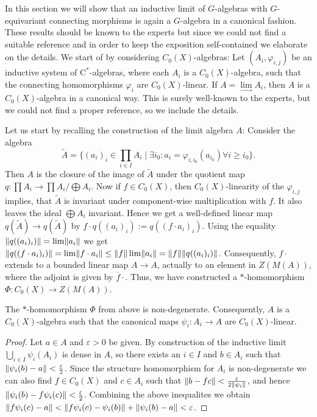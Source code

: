 In this section we will show that an inductive limit of $G$-algebras with $G$-equivariant connecting morphisms is again a $G$-algebra in a canonical fashion. These results should be known to the experts but since we could not find a suitable reference and in order to keep the exposition self-contained we elaborate on the details. We start of by considering $C_0(X)$-algebras:
	Let $(A_i,\varphi_{i,j})$ be an inductive system of $\mathrm{C}^*$-al\-gebras, where each $A_i$ is a $C_0(X)$-algebra, such that the connecting homomorphisms $\varphi_i$ are $C_0(X)$-linear.
	If $A=\lim\limits_{\rightarrow}A_i$, then $A$ is a $C_0(X)$-algebra in a canonical way. This is surely well-known to the experts, but we could not find a proper reference, so we include the details.
	
	Let us start by recalling the construction of the limit algebra $A$:
	Consider the algebra $$\widetilde{A}=\lbrace (a_i)_i\in\prod\limits_{i\in I}A_i\mid \exists i_0: a_{i}=\varphi_{i,i_0}(a_{i_0})\forall i\geq i_0\rbrace.$$
	Then $A$ is the closure of the image of $\widetilde{A}$ under the quotient map $q:\prod A_i\rightarrow \prod A_i/\bigoplus A_i$.
	Now if $f\in C_0(X)$, then $C_0(X)$-linearity of the $\varphi_{i,j}$ implies, that $\widetilde{A}$ is invariant under component-wise multiplication with $f$. It also leaves the ideal $\bigoplus A_i$ invariant. Hence we get a well-defined linear map
	$q(\widetilde{A})\rightarrow q(\widetilde{A})$ by $f\cdot q((a_i)_i):=q((f\cdot a_i)_i)$. Using the equality $\lVert q((a_i)_i)\rVert=\lim \lVert a_i\rVert$ we get
	$\lVert q((f\cdot a_i)_i)\rVert=\lim \lVert f\cdot a_i\rVert\leq \lVert f\rVert\lim \lVert a_i\rVert=\lVert f\rVert\lVert q((a_i)_i)\rVert$. Consequently, $f\cdot$ extends to a bounded linear map $A\rightarrow A$, actually to an element in $Z(M(A))$, where the adjoint is given by $\overline{f}\cdot$. Thus, we have constructed a $*$-homomorphism $\Phi:C_0(X)\rightarrow Z(M(A))$. 
	\begin{lemma}\label{Lem:InductiveLimitsOfC_0(X)-algebras}
		The $*$-homomorphism $\Phi$ from above is non-degener\-ate. Consequently, $A$ is a $C_0(X)$-algebra such that the canonical maps $\psi_{i}:A_i\rightarrow A$ are $C_0(X)$-linear.
	\end{lemma}
	\begin{proof}
		Let $a\in A$ and $\varepsilon>0$ be given. By construction of the inductive limit $\bigcup_{i\in I} \psi_i(A_i)$ is dense in $A$, so there exists an $i\in I$ and $b\in A_i$ such that $\lVert\psi_i(b)-a\rVert<\frac{\varepsilon}{2}$. Since the structure homomorphism for $A_i$ is non-degenerate we can also find $f\in C_0(X)$ and $c\in A_i$ such that $\lVert b-fc\rVert< \frac{\varepsilon}{2\lVert\psi_i\rVert}$, and hence $\lVert\psi_i(b)-f\psi_i(c)\rVert<\frac{\varepsilon}{2}$.
		Combining the above inequalites we obtain
		$\lVert f\psi_i(c)-a\rVert<\lVert f\psi_i(c)-\psi_i(b)\rVert+\lVert\psi_i(b)-a\rVert<\varepsilon$.
	\end{proof}
	
